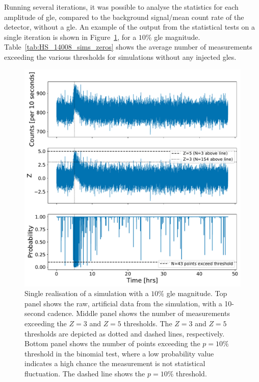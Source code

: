 Running several iterations, it was possible to analyse the statistics for each amplitude of \gls{gle}, compared to the background signal/mean count rate of the detector, without a \gls{gle}. An example of the output from the statistical tests on a single iteration is shown in Figure~\ref{fig:simulated_data_stats}, for a $10 \%$ \gls{gle} magnitude. Table~\ref{tab:HS_14008_sims_zeros} shows the average number of measurements exceeding the various thresholds for simulations without any injected \glspl{gle}.


\begin{figure}[ht!]
	\centering
	\includegraphics[width=0.9\columnwidth]{simulated_data_stats.pdf}
	\caption{Single realisation of a simulation with a $10\%$ \gls{gle} magnitude. Top panel shows the raw, artificial data from the simulation, with a 10-second cadence. Middle panel shows the number of measurements exceeding the $Z=3$ and $Z=5$ thresholds. The $Z=3$ and $Z=5$ thresholds are depicted as dotted and dashed lines, respectively. Bottom panel shows the number of points exceeding the $p = 10 \%$ threshold in the binomial test, where a low probability value indicates a high chance the measurement is not statistical fluctuation. The dashed line shows the $p = 10 \%$ threshold.}
	\label{fig:simulated_data_stats}
\end{figure}

\vspace{1em}

